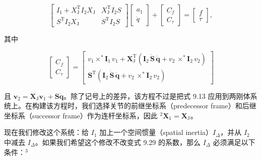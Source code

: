 \documentclass[10pt,a4paper]{book}
\theoremstyle{thmstyle} %
\theoremstyle{defstyle} %
\theoremstyle{prostyle} %
\begin{document}
$$
\left[ \begin{array}{ll} { I _ { 1 } + X _ { \mathrm { J } } ^{\mathrm { T} } I _ { 2 } X _ { \mathrm { J } } } & { X _ { \mathrm { J } } ^{\mathrm { T} } I _ { 2 } S } \\ { S ^{\mathrm { T} } I _ { 2 } X _ { \mathrm { J } } } & { S ^{\mathrm { T} } I _ { 2 } S } \end{array} \right] \left[ \begin{array}{l} { a _ { 1 } } \\ { \ddot { q } } \end{array} \right] + \left[ \begin{array}{l} { C _ { f } } \\ { C _ { \tau } } \end{array} \right] = \left[ \begin{array}{l} { f } \\ { \tau } \end{array} \right] ,
$$



其中



$$
\left[ \begin{array}{l} { C _ { f } } \\{ C _ { \tau } } \end{array} \right] = \left[ \begin{array}{l} { v _ { 1 } \times ^{*} \boldsymbol{ I } _ { 1 } \, v _ { 1 } + \boldsymbol{ X } _ { \mathrm { J } } ^{\mathrm { T} } ( \boldsymbol{ I } _ { 2 } \, \dot { \boldsymbol{ S } } \, \dot { \boldsymbol{ q } } + v _ { 2 } \, \times ^{*} \boldsymbol{ I } _ { 2 } \, v _ { 2 } ) } \\{ \boldsymbol{ S } ^{\mathrm { T} } ( \boldsymbol{ I } _ { 2 } \, \dot { \boldsymbol{ S } } \, \dot { \boldsymbol{ q } } + v _ { 2 } \, \times ^{*} \boldsymbol{ I } _ { 2 } \, v _ { 2 } ) } \end{array} \right]
$$



且 $\boldsymbol{v}_{2}=\boldsymbol{X}_{\mathrm{J}} \boldsymbol{v}_{1}+\boldsymbol{S} \dot{\boldsymbol{q}}$。除了记号上的差异，该方程不过是把式 9.13 应用到两刚体系统上。在构建该方程时，我们选择关节的前继坐标系（predecessor frame）和后继坐标系（successor frame）作为连杆坐标系，因此 ${}^{2} \boldsymbol{X}_{1}=\boldsymbol{X}_{\mathrm{J}}$。



现在我们修改这个系统：给 $I_{1}$ 加上一个空间惯量（spatial inertia）$I_{\Delta}$，并从 $I_{2}$ 中减去 $I_{\Delta}$。如果我们希望这个修改不改变式 9.29 的系数，那么 $I_{\Delta}$ 必须满足以下条件：$^{3}$
\end{document}
